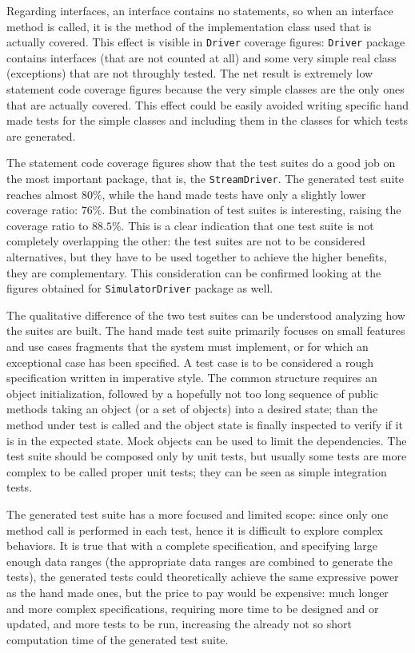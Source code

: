 \documentclass{article} \usepackage{times}
\newcommand{\lil}[1]{\texttt{\lstinline|#1|}}
\begin{document}
Regarding interfaces, an interface contains no statements, so when an
interface method is called, it is the method of the implementation
class used that is actually covered. This effect is visible in
\lil{Driver} coverage figures: \lil{Driver} package contains
interfaces (that are not counted at all) and some very simple real
class (exceptions) that are not throughly tested. The net result is
extremely low statement code coverage figures because the very simple
classes are the only ones that are actually covered. This effect could
be easily avoided writing specific hand made tests for the simple
classes and including them in the classes for which tests are
generated.

The statement code coverage figures show that the test suites do a
good job on the most important package, that is, the
\lil{StreamDriver}. The generated test suite reaches almost $ 80 \% $,
while the hand made tests have only a slightly lower coverage ratio: $
76 \% $. But the combination of test suites is interesting, raising
the coverage ratio to $ 88.5 \% $. This is a clear indication that one
test suite is not completely overlapping the other: the test suites
are not to be considered alternatives, but they have to be used
together to achieve the higher benefits, they are complementary. This
consideration can be confirmed looking at the figures obtained for
\lil{SimulatorDriver} package as well.

The qualitative difference of the two test suites can be understood
analyzing how the suites are built. The hand made test suite primarily
focuses on small features and use cases fragments that the system must
implement, or for which an exceptional case has been specified. A test
case is to be considered a rough specification written in imperative
style. The common structure requires an object initialization,
followed by a hopefully not too long sequence of public methods taking
an object (or a set of objects) into a desired state; than the method
under test is called and the object state is finally inspected to
verify if it is in the expected state. Mock objects can be used to
limit the dependencies. The test suite should be composed only by unit
tests, but usually some tests are more complex to be called proper
unit tests; they can be seen as simple integration tests.

The generated test suite has a more focused and limited scope: since
only one method call is performed in each test, hence it is difficult
to explore complex behaviors. It is true that with a complete
specification, and specifying large enough data ranges (the
appropriate data ranges are combined to generate the tests), the
generated tests could theoretically achieve the same expressive power
as the hand made ones, but the price to pay would be expensive: much
longer and more complex specifications, requiring more time to be
designed and or updated, and more tests to be run, increasing the
already not so short computation time of the generated test suite.
\end{document}
